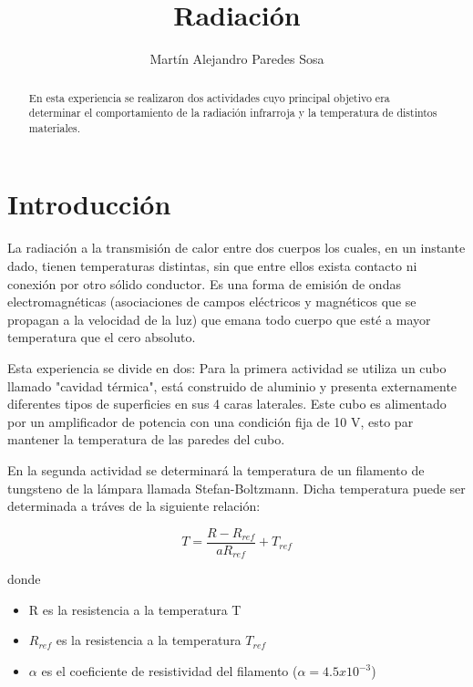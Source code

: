 \documentclass[12pt]{article}
\title{Radiación}
\author{Martín Alejandro Paredes Sosa}
\makeatletter
\let\thetitle\@title
\let\theauthor\@author
\makeatother
\begin{document}
\begin{center}
{ \large \bfseries \thetitle}
\end{center}
	\begin{minipage}{\textwidth}
		\begin{center} 
			\theauthor 
			\end{center}
	\end{minipage}
\begin{abstract}
En esta experiencia se realizaron dos actividades cuyo principal objetivo era determinar el comportamiento de la radiación infrarroja y la temperatura de distintos materiales.
\end{abstract}
\vspace{-1cm}
\section{Introducción}
\vspace{-0.5cm}
La radiación a la transmisión de calor entre dos cuerpos los cuales, en un instante dado, tienen temperaturas distintas, sin que entre ellos exista contacto ni conexión por otro sólido conductor. Es una forma de emisión de ondas electromagnéticas (asociaciones de campos eléctricos y magnéticos que se propagan a la velocidad de la luz) que emana todo cuerpo que esté a mayor temperatura que el cero absoluto. 

Esta experiencia se divide en dos:
Para la primera actividad se utiliza un cubo llamado "cavidad térmica", está construido de aluminio y presenta externamente diferentes tipos de superficies en sus 4 caras laterales. Este cubo es alimentado por un amplificador de potencia con una condición fija de 10 V, esto par mantener la temperatura de las paredes del cubo.

En la segunda actividad se determinará la temperatura de un filamento de tungsteno de la lámpara llamada Stefan-Boltzmann. Dicha temperatura puede ser determinada a tráves de la siguiente relación:

\begin{equation}
T = \frac{R- R_{ref}}{aR_{ref}} + T_{ref}
\end{equation}


donde
\begin{itemize}
\item R es la resistencia a la temperatura T
\item $R_{ref}$ es la resistencia a la temperatura $T_{ref}$
\item $\alpha$ es el coeficiente de resistividad del filamento ($\alpha = 4.5 x 10^{-3}$)
\end{itemize}
\end{document}

